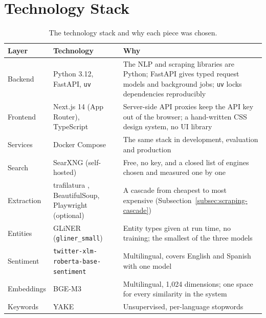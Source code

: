
\section{Technology Stack}
\label{sec:stack}

\begin{table}[ht]
\centering
\small
\caption{The technology stack and why each piece was chosen.}
\label{tab:stack}
\begin{tabularx}{\linewidth}{@{}lXX@{}}
\toprule
\textbf{Layer} & \textbf{Technology} & \textbf{Why} \\
\midrule
Backend & Python 3.12, FastAPI, \texttt{uv} & The NLP and scraping
libraries are Python; FastAPI gives typed request models and
background jobs; \texttt{uv} locks dependencies reproducibly \\
Frontend & Next.js 14 (App Router), TypeScript & Server-side API
proxies keep the API key out of the browser; a hand-written CSS design
system, no UI library \\
Services & Docker Compose & The same stack in development, evaluation
and production \\
Search & SearXNG (self-hosted) & Free, no key, and a closed list of
engines chosen and measured one by one \\
Extraction & trafilatura \cite{barbaresi2021trafilatura},
BeautifulSoup, Playwright (optional) & A cascade from cheapest to most
expensive (Subsection~\ref{subsec:scraping-cascade}) \\
Entities & GLiNER (\texttt{gliner\_small})
\cite{zaratiana2024gliner} & Entity types given at run time, no
training; the smallest of the three models \\
Sentiment & \texttt{twitter-xlm-roberta-}\allowbreak\texttt{base-sentiment}
\cite{barbieri2022xlmt} & Multilingual, covers English and Spanish
with one model \\
Embeddings & BGE-M3 \cite{chen2024bgem3} & Multilingual, 1,024
dimensions; one space for every similarity in the system \\
Keywords & YAKE \cite{campos2020yake} & Unsupervised, per-language
stopwords \\

\end{tabularx}
\end{table}
